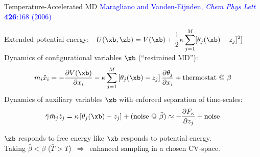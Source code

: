 \begin{frame}[fragile]{Temperature-Accelerated MD}
\vspace{-5mm}
\textcolor{blue}{\tiny Maragliano and Vanden-Eijnden, {\it Chem Phys Lett} {\bf 
426}:168 (2006)}

Extended potential energy:\ \ $\displaystyle U(\xb,\zb) = V(\xb) + 
\frac{1}{2}\kappa\sum_{j=1}^{M}[\theta_j(\xb)-z_j]^2]$\\
Dynamics of configurational variables $\xb$ (``restrained MD''):
\begin{displaymath}
m_i\ddot{x}_i = -\frac{\partial V(\xb)}{\partial 
x_i}-\kappa\sum_{j=1}^{M}\left[\theta_j(\xb)-z_j\right]\frac{\partial\theta_j}{
\partial x_i}+\mbox{thermostat @ $\beta$}
\end{displaymath}
Dynamics of auxiliary variables $\zb$ with enforced separation of time-scales:
\begin{displaymath}
\bar\gamma\bar{m}_j\dot{z}_j = \kappa\left[\theta_j(\xb)-z_j\right] + 
(\mbox{noise @ $\bar\beta$}) \approx -\frac{\partial F_{\kappa}}{\partial z_j} + 
\mbox{noise}
\end{displaymath}

$\zb$ responds to free energy like $\xb$ responds to potential energy.\\
Taking $\bar\beta < \beta$ ($\bar{T} > T$)\ $\Rightarrow$\ enhanced sampling in 
a chosen CV-space.

\end{frame}
